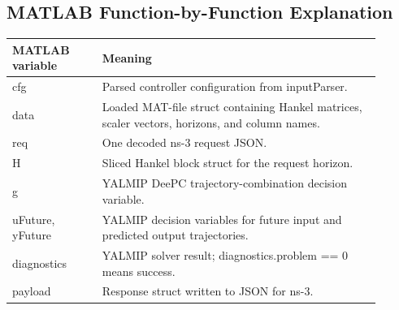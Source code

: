 \documentclass[11pt]{article}
\DeclareRobustCommand{\code}[1]{\texttt{\detokenize{#1}}}
\def\code#1{#1}%
\begin{document}
\subsection{MATLAB Function-by-Function Explanation}

\begin{center}
\begin{tabular}{L{0.22\linewidth}L{0.68\linewidth}}
\toprule
MATLAB variable & Meaning \\
\midrule
\code{cfg} &
Parsed controller configuration from \code{inputParser}. \\
\code{data} &
Loaded MAT-file struct containing Hankel matrices, scaler vectors, horizons, and
column names. \\
\code{req} &
One decoded ns-3 request JSON. \\
\code{H} &
Sliced Hankel block struct for the request horizon. \\
\code{g} &
YALMIP DeePC trajectory-combination decision variable. \\
\code{uFuture}, \code{yFuture} &
YALMIP decision variables for future input and predicted output trajectories. \\
\code{diagnostics} &
YALMIP solver result; \code{diagnostics.problem == 0} means success. \\
\code{payload} &
Response struct written to JSON for ns-3. \\
\bottomrule
\end{tabular}
\end{center}
\end{document}
